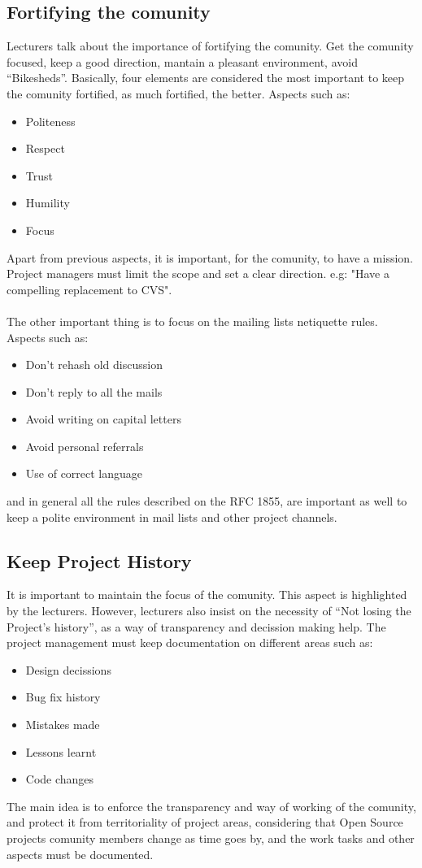 \documentclass[11pt]{article}
\begin{document}
\subsection{Fortifying the comunity}
Lecturers talk about the importance of fortifying the comunity. Get the comunity focused, keep a good direction, mantain a pleasant environment, avoid ``Bikesheds''.
  Basically, four elements are considered the most important to keep the comunity fortified, as much fortified, the better. Aspects such as:
\begin{itemize}\itemsep0pt
\item{Politeness}
\item{Respect}
\item{Trust}
\item{Humility}
\item{Focus}
\end{itemize}
Apart from previous aspects, it is important, for the comunity, to have a mission. Project managers must limit the scope and set a clear direction. e.g: "Have a compelling replacement to CVS".\\
\\
The other important thing is to focus on the mailing lists netiquette rules. Aspects such as:
\begin{itemize}\itemsep0pt
\item{Don't rehash old discussion}
\item{Don't reply to all the mails}
\item{Avoid writing on capital letters}
\item{Avoid personal referrals}
\item{Use of correct language}
\end{itemize}
and in general all the rules described on the RFC 1855, are important as well to keep a polite environment in mail lists and other project channels.
\subsection{Keep Project History}
It is important to maintain the focus of the comunity. This aspect is highlighted by the lecturers. However, lecturers also insist on the necessity of ``Not losing the Project's history'', as a way of transparency and decission making help. The project management must keep documentation on different areas such as:
\begin{itemize}\itemsep0pt
\item{Design decissions}
\item{Bug fix history}
\item{Mistakes made}
\item{Lessons learnt}
\item{Code changes}
\end{itemize}
The main idea is to enforce the transparency and way of working of the comunity, and protect it from territoriality of project areas, considering that Open Source projects comunity members change as time goes by, and the work tasks and other aspects must be documented.
\end{document}

